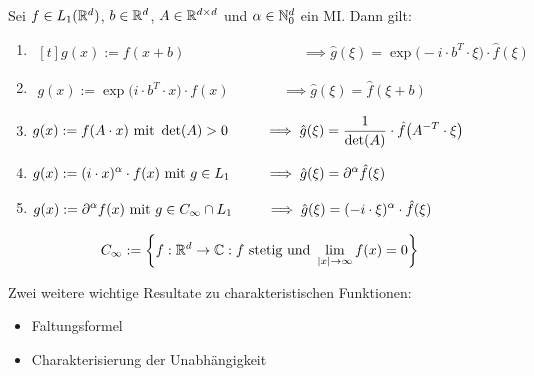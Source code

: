 \begin{korollar}\label{korollar6.3}
	Sei $f\in L_1(\R^d)$, $b\in\R^d$, $A\in\R^{d\times d}$ und $\alpha\in\N_0^d$ ein MI. Dann gilt:
	\begin{enumerate}[label=(\alph*)]
		\item $\begin{aligned}[t]
			g(x):=f(x+b) 
			\hspace{100pt}
			\implies \hat{g}(\xi)=\exp\big(-i\cdot b^T\cdot\xi\big)\cdot\hat{f}(\xi)
		\end{aligned}$
		\item $\begin{aligned}
			g(x):=\exp\big(i\cdot b^T\cdot x\big)\cdot f(x) 
			\hspace{45pt}
			\implies \hat{g}(\xi)=\hat{f}(\xi+b)
		\end{aligned}$
		\item $\begin{aligned}
			g(x):=f(A\cdot x)\mit \det(A)>0 
			\hspace{24pt}
			\implies \hat{g}(\xi)=\frac{1}{\det(A)}\cdot\hat{f}\big(A^{-T}\cdot\xi\big)
		\end{aligned}$
		\item $\begin{aligned}
			g(x):=(i\cdot x)^\alpha\cdot f(x)\mit g\in L_1 
			\hspace{23pt}
			\implies \hat{g}(\xi)=\partial^\alpha\hat{f}(\xi)
		\end{aligned}$
		\item $\begin{aligned}
			g(x):=\partial^\alpha f(x)\mit g\in C_\infty\cap L_1 
			\hspace{22pt}
			\implies \hat{g}(\xi)=(-i\cdot\xi)^\alpha\cdot\hat{f}(\xi)
		\end{aligned}$
	\end{enumerate}
\end{korollar}

\begin{bemerkung}
	\begin{align*}
		C_\infty:=\left\lbrace f:\R^d\to\C:f\text{ stetig und }\lim\limits_{|x|\to\infty}f(x)=0\right\rbrace
	\end{align*}
\end{bemerkung}

Zwei weitere wichtige Resultate zu charakteristischen Funktionen:
\begin{itemize}
	\item Faltungsformel
	\item Charakterisierung der Unabhängigkeit
\end{itemize}

